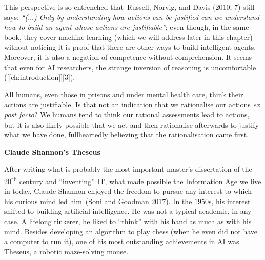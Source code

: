 \documentclass[
  letterpaper,
  12pt,
  british]{tufte-book}
\theoremstyle{plain}
\theoremstyle{definition}
\theoremstyle{plain}
\theoremstyle{remark}
\begin{document}
This perspective is so entrenched that~Russell, Norvig, and Davis (2010,
7)
still says: \emph{``(\(\ldots\)) Only by understanding how actions can
be justified can we understand how to build an agent whose actions are
justifiable''}; even though, in the same book, they cover machine
learning (which we will address later in this chapter) without noticing
it is proof that there are other ways to build intelligent agents.
Moreover, it is also a negation of competence without comprehension. It
seems that even for AI researchers, the strange inversion of reasoning
is uncomfortable ({[}{[}ch:introduction{]}{]}{[}3{]}).

All humans, even those in prisons and under mental health care, think
their actions are justifiable. Is that not an indication that we
rationalise our actions \emph{ex post facto}? We humans tend to think
our rational assessments lead to actions, but it is also likely possible
that we act and then rationalise afterwards to justify what we have
done, fullheartedly believing that the rationalisation came first.

\textbf{Claude Shannon's Theseus}

After writing what is probably the most important master's dissertation
of the 20\textsuperscript{th} century and ``inventing'' {IT}, what made
possible the Information Age we live in today, Claude Shannon enjoyed
the freedom to pursue any interest to which his curious mind led
him~(Soni and Goodman
2017).
In the \(1950\)s, his interest shifted to building artificial
intelligence. He was not a typical academic, in any case. A lifelong
tinkerer, he liked to ``think'' with his hand as much as with his mind.
Besides developing an algorithm to play chess (when he even did not have
a computer to run it), one of his most outstanding achievements in AI
was Theseus, a robotic maze-solving mouse.
\end{document}
